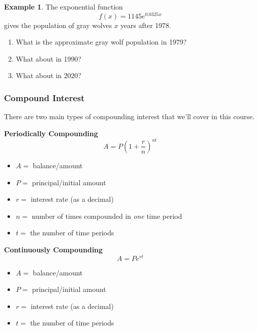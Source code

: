\documentclass[addpoints,12pt]{exam}
\theoremstyle{definition}
\theoremstyle{break}
\theoremstyle{break}
\newtheorem{example}{Example}[subsection]
\begin{document}
\vspace{.15in}

\begin{example}
The exponential function
\[f(x) = 1145e^{0.0325x}\]
gives the population of gray wolves $x$ years after 1978.

\begin{enumerate}
\item What is the approximate gray wolf population in 1979?
\vspace{1in}
\item What about in 1990?
\vspace{1in}
\item What about in 2020?
\vspace{1in}
\end{enumerate}
\end{example}

\newpage

\subsubsection*{Compound Interest}
\noindent There are two main types of compounding interest that we'll cover in this course.
\vspace{.15in}
\begin{mdframed}
\textbf{Periodically Compounding}\\
\[A = P\left(1+\dfrac{r}{n}\right)^{nt}\]
\begin{itemize}
\item $A = $ balance/amount
\item $P = $ principal/initial amount
\item $r = $ interest rate (as a decimal)
\item $n = $ number of times compounded in \emph{one} time period
\item $t = $ the number of time periods
\end{itemize}
\end{mdframed}
\vspace{.15in}
\begin{mdframed}
\textbf{Continuously Compounding}\\
\[A = Pe^{rt}\]
\begin{itemize}
\item $A = $ balance/amount
\item $P = $ principal/initial amount
\item $r = $ interest rate (as a decimal)
\item $t = $ the number of time periods
\end{itemize}
\end{mdframed}
\end{document}
